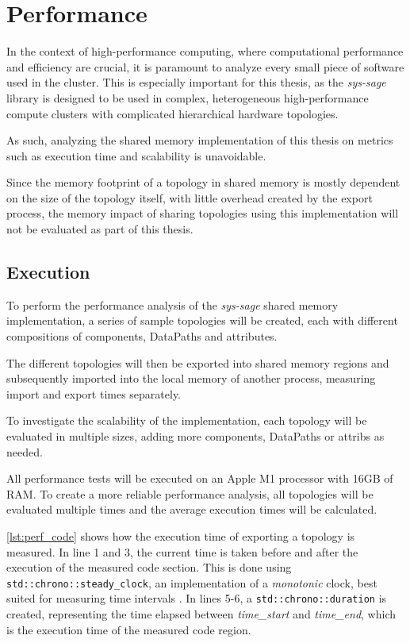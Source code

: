 \chapter{Performance}\label{chapter:Performance}
In the context of high-performance computing, where computational performance and efficiency are crucial, it is paramount to analyze every small piece of software used in the cluster.
This is especially important for this thesis, as the \emph{sys-sage} library is designed to be used in complex, heterogeneous high-performance compute clusters with complicated hierarchical hardware topologies.

As such, analyzing the shared memory implementation of this thesis on metrics such as execution time and scalability is unavoidable.

Since the memory footprint of a topology in shared memory is mostly dependent on the size of the topology itself, with little overhead created by the export process,
the memory impact of sharing topologies using this implementation will not be evaluated as part of this thesis.

\section{Execution}
To perform the performance analysis of the \emph{sys-sage} shared memory implementation, a series of sample topologies will be created, each with different compositions of components, DataPaths and attributes.

The different topologies will then be exported into shared memory regions and subsequently imported into the local memory of another process,
measuring import and export times separately.

To investigate the scalability of the implementation, each topology will be evaluated in multiple sizes, adding more components, DataPaths or attribs as needed.

All performance tests will be executed on an Apple M1 processor with 16GB of RAM.
To create a more reliable performance analysis, all topologies will be evaluated multiple times and the average execution times will be calculated.

\autoref{lst:perf_code} shows how the execution time of exporting a topology is measured. In line 1 and 3, the current time is taken before and after the execution of the measured code section.
This is done using \lstinline|std::chrono::steady_clock|, an implementation of a \emph{monotonic} clock, best suited for measuring time intervals \cite{monotonic_clock}.
In lines 5-6, a \lstinline|std::chrono::duration| is created, representing the time elapsed between \emph{time\_start} and \emph{time\_end}, which is the execution time of the measured code region.

